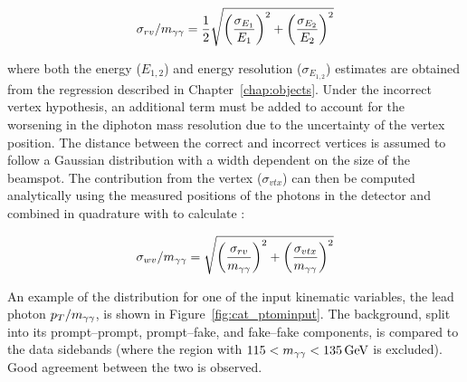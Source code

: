 \begin{equation}
  \sigma_{rv}/m_{\gamma\gamma} = \frac{1}{2} \sqrt{\left(\frac{\sigma_{E_1}}{E_1}\right)^{2}
                              + \left(\frac{\sigma_{E_2}}{E_2}\right)^{2}}
\end{equation}

where both the energy ($E_{1,2}$) and energy resolution ($\sigma_{E_{1,2}}$) estimates 
are obtained from the regression described in Chapter~\ref{chap:objects}.
Under the incorrect vertex hypothesis, an additional term must be added to account for the 
worsening in the diphoton mass resolution due to the uncertainty of the vertex position.
The distance between the correct and incorrect vertices is assumed to follow a Gaussian distribution
with a width dependent on the size of the beamspot.
The contribution from the vertex ($\sigma_{vtx}$) can then be computed analytically 
using the measured positions of the photons in the detector 
and combined in quadrature with \srv to calculate \swv:

\begin{equation}
  \sigma_{wv}/m_{\gamma\gamma} = \sqrt{\left(\frac{\sigma_{rv}}{m_{\gamma\gamma}}\right)^{2}
                              + \left(\frac{\sigma_{vtx}}{m_{\gamma\gamma}}\right)^{2}}
\end{equation}

An example of the distribution for one of the input kinematic variables, the lead photon $p_T/m_{\gamma\gamma}$, 
is shown in Figure~\ref{fig:cat_ptominput}.
The background, split into its prompt--prompt, prompt--fake, and fake--fake components, 
is compared to the data sidebands (where the region with $115 < m_{\gamma\gamma} < \SI{135}{GeV}$ is excluded).
Good agreement between the two is observed.


